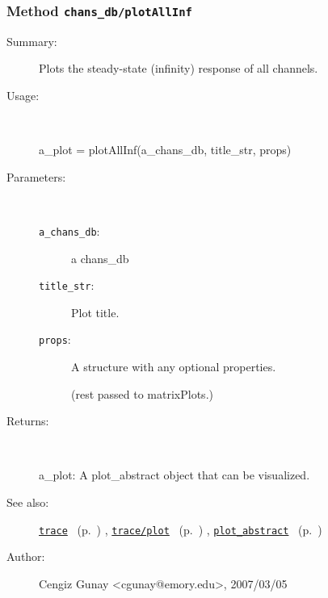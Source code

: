 \subsubsection[Method \texttt{plotAllInf}]{Method \texttt{chans\_db/plotAllInf}}%
%
\label{ref_chans_db__plotAllInf}%
\hypertarget{ref_chans_db__plotAllInf}{}%
\begin{description}
\item[Summary:]Plots the steady-state (infinity) response of all channels.
%
\item[Usage:]~%
\begin{lyxcode}%
a\_plot = plotAllInf(a\_chans\_db, title\_str, props)
%
\end{lyxcode}%
%
%
\item[Parameters:]~
\begin{description}%
\item[\texttt{a\_chans\_db}:]
 a chans\_db
\item[\texttt{title\_str}:]
 Plot title.
\item[\texttt{props}:]
 A structure with any optional properties.

(rest passed to matrixPlots.)\end{description}%
%
\item[Returns:]~

	a\_plot: A plot\_abstract object that can be visualized.
%
%
\item[See also:]%
\hyperlink{ref_trace}{\texttt{trace}}%
\ (p.~\pageref{ref_trace})%
%
, \hyperlink{ref_trace__plot}{\texttt{trace/plot}}%
\ (p.~\pageref{ref_trace__plot})%
%
, \hyperlink{ref_plot_abstract}{\texttt{plot\_abstract}}%
\ (p.~\pageref{ref_plot_abstract})%
%
%
\item[Author:]%
Cengiz Gunay <cgunay@emory.edu>, 2007/03/05%
\end{description}
\methodline%
